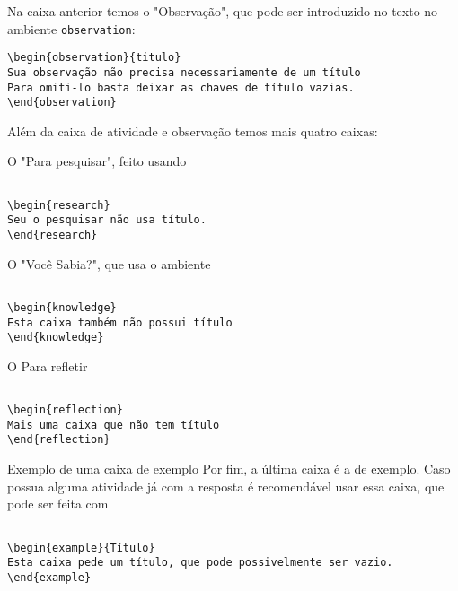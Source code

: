 Na caixa anterior temos o "Observação", que pode ser introduzido no texto no ambiente \verb|observation|:
\begin{verbatim}
\begin{observation}{titulo}
Sua observação não precisa necessariamente de um título
Para omiti-lo basta deixar as chaves de título vazias.
\end{observation}
\end{verbatim}

Além da caixa de atividade e observação temos mais quatro caixas:

\begin{research}
O "Para pesquisar", feito usando

\begin{verbatim}

\begin{research}
Seu o pesquisar não usa título.
\end{research}
\end{verbatim}
\end{research}

\begin{knowledge}
O "Você Sabia?", que usa o ambiente

\begin{verbatim}

\begin{knowledge}
Esta caixa também não possui título
\end{knowledge}
\end{verbatim}
\end{knowledge}

\begin{reflection}
O Para refletir

\begin{verbatim}

\begin{reflection}
Mais uma caixa que não tem título
\end{reflection}
\end{verbatim}
\end{reflection}

\begin{example}{Exemplo de uma caixa de exemplo}
Por fim, a última caixa é a de exemplo. Caso possua alguma atividade já com a resposta é recomendável usar essa caixa, que pode ser feita com
\begin{verbatim}

\begin{example}{Título}
Esta caixa pede um título, que pode possivelmente ser vazio.
\end{example}
\end{verbatim}
\end{example}

